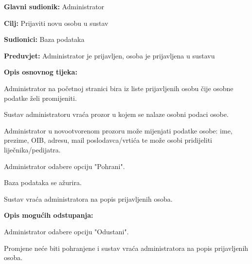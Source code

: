 					\noindent {}
					\begin{packed_item}
						
						\item \textbf{Glavni sudionik: }Administrator
						\item  \textbf{Cilj:} Prijaviti novu osobu u sustav
						\item  \textbf{Sudionici:} Baza podataka
						\item  \textbf{Preduvjet:} Administrator je prijavljen, osoba je prijavljena u sustavu
						\item  \textbf{Opis osnovnog tijeka:}
						
						\item[] \begin{packed_enum}
							
							\item Administrator na početnoj stranici bira iz liste prijavljenih osobu čije osobne podatke želi promijeniti.
							\item Sustav administratoru vraća prozor u kojem se nalaze osobni podaci osobe.
							\item Administrator u novootvorenom prozoru može mijenjati podatke osobe: ime, prezime, OIB, adresu, mail poslodavca/vrtića te može osobi pridijeliti liječnika/pedijatra.
							\item Administrator odabere opciju "Pohrani".
							\item Baza podataka se ažurira.
							\item Sustav vraća administratora na popis prijavljenih osoba.
						\end{packed_enum}
						
						\item  \textbf{Opis mogućih odstupanja:}
						
						\item[] \begin{packed_item}
							
							\item[4.a] Administrator odabere opciju "Odustani".
							\item[] \begin{packed_enum}
								
								\item Promjene neće biti pohranjene i sustav vraća administratora na popis prijavljenih osoba.
							\end{packed_enum}
							
							
						\end{packed_item}
						
						
					\end{packed_item}
					

